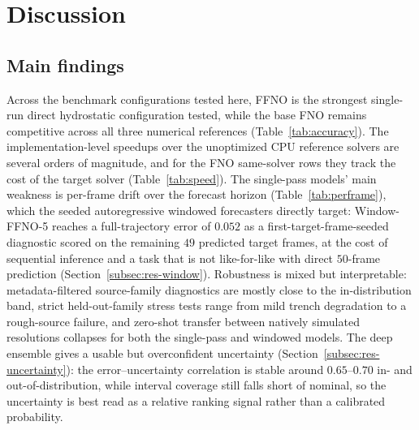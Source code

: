 \section{Discussion}
\label{sec:discussion}

\subsection{Main findings}
Across the benchmark configurations tested here, FFNO is the strongest single-run direct hydrostatic configuration tested, while the base FNO remains competitive across all three numerical references (Table~\ref{tab:accuracy}). The implementation-level speedups over the unoptimized CPU reference solvers are several orders of magnitude, and for the FNO same-solver rows they track the cost of the target solver (Table~\ref{tab:speed}). The single-pass models' main weakness is per-frame drift over the forecast horizon (Table~\ref{tab:perframe}), which the seeded autoregressive windowed forecasters directly target: Window-FFNO-5 reaches a full-trajectory error of $0.052$ as a first-target-frame-seeded diagnostic scored on the remaining $49$ predicted target frames, at the cost of sequential inference and a task that is not like-for-like with direct $50$-frame prediction (Section~\ref{subsec:res-window}). Robustness is mixed but interpretable: metadata-filtered source-family diagnostics are mostly close to the in-distribution band, strict held-out-family stress tests range from mild trench degradation to a rough-source failure, and zero-shot transfer between natively simulated resolutions collapses for both the single-pass and windowed models. The deep ensemble gives a usable but overconfident uncertainty (Section~\ref{subsec:res-uncertainty}): the error--uncertainty correlation is stable around $0.65$--$0.70$ in- and out-of-distribution, while interval coverage still falls short of nominal, so the uncertainty is best read as a relative ranking signal rather than a calibrated probability.

